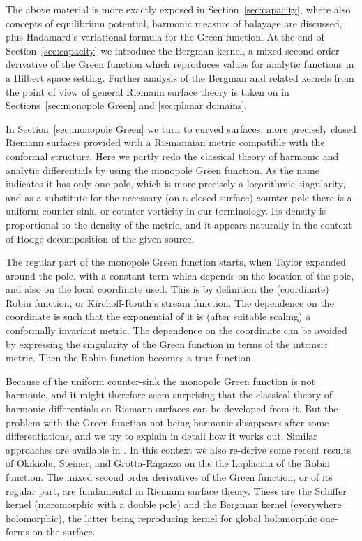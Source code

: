 \documentclass[reqno,12pt]{article}
\theoremstyle{plain}
\theoremstyle{definition}
\numberwithin{equation}{section}
\numberwithin{figure}{section}
\begin{document}
The above material is more exactly exposed in Section~\ref{sec:capacity}, where also concepts of equilibrium potential, 
harmonic measure of balayage are discussed, plus Hadamard's variational formula for the Green function.
At the end of Section~\ref{sec:capacity} we introduce the Bergman kernel, 
a mixed second order derivative of the Green function which
reproduces values for analytic functions in a Hilbert space setting.  
Further analysis of the Bergman and related kernels from the point of view of general  Riemann surface theory
is taken on in Sections~\ref{sec:monopole Green} and \ref{sec:planar domains}.

In Section~\ref{sec:monopole Green} we turn to curved surfaces, more precisely closed Riemann surfaces provided 
with a Riemannian metric compatible with the conformal structure. 
Here we partly redo the classical theory of harmonic and analytic differentials by
using the monopole Green function. As the name indicates it has only one pole, which is 
more precisely a logarithmic singularity, and as a substitute for the 
necessary (on a closed surface) counter-pole there is a uniform counter-sink, or counter-vorticity in our terminology.
Its density is proportional to the density of the metric, and it appears naturally in the context of Hodge decomposition of the
given source.

The regular part of the monopole Green function starts, when Taylor expanded around the pole, with a constant term which
depends on the location of the pole, and also on the local coordinate used. 
This is by definition the (coordinate) Robin function, or Kirchoff-Routh's stream function. The dependence on the
coordinate is such that the exponential of it is (after suitable scaling) a conformally invariant metric. 
The dependence on the coordinate can be avoided by  expressing the singularity of the Green function in terms of the intrinsic metric. 
Then the Robin function becomes a true function. 

Because of the uniform counter-sink the monopole Green function is not harmonic, and it might therefore seem surprising that
the classical theory of harmonic differentials on Riemann surfaces can be developed from it. 
But the problem with the Green function not being harmonic disappears after some 
differentiations, and we try to explain in detail how it works out. Similar approaches are available in
\cite{Lang-1988, Takhtajan-2001}. In this context we also re-derive some recent results
of Okikiolu, Steiner, and Grotta-Ragazzo on the  the Laplacian of the Robin function. 
The mixed second order derivatives of the Green function, or of its regular part, are fundamental in Riemann surface theory. 
These are the Schiffer kernel (meromorphic with a double pole) and the Bergman kernel (everywhere holomorphic),
the latter being reproducing kernel for global holomorphic one-forms on the surface.
\end{document}
